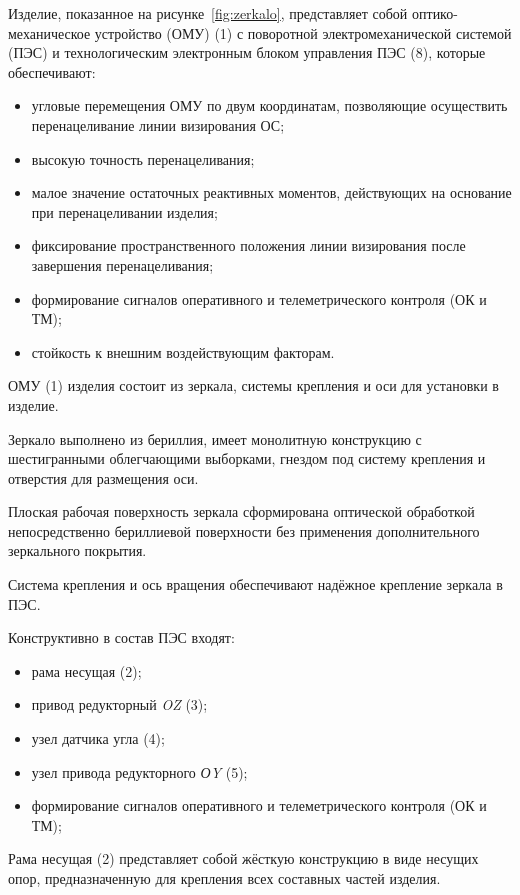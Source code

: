 Изделие, показанное на рисунке~\cref{fig:zerkalo}, представляет собой оптико-механическое устройство (ОМУ) (1) с поворотной электромеханической системой (ПЭС) и технологическим электронным блоком управления ПЭС (8), которые обеспечивают:
\begin{itemize}[beginpenalty=10000] %
	\item угловые перемещения ОМУ по двум координатам, позволяющие осуществить перенацеливание линии визирования ОС;
	\item высокую точность перенацеливания;
	\item малое значение остаточных реактивных моментов, действующих на основание при перенацеливании изделия;
	\item фиксирование пространственного положения линии визирования после завершения перенацеливания;
	\item формирование сигналов оперативного и телеметрического контроля (ОК и ТМ);
	\item стойкость к внешним воздействующим факторам.
\end{itemize}

ОМУ (1) изделия состоит из зеркала, системы крепления и оси для установки в изделие.

Зеркало выполнено из бериллия, имеет монолитную конструкцию с шестигранными облегчающими выборками, гнездом под систему крепления и отверстия для размещения оси.

Плоская рабочая поверхность зеркала сформирована оптической обработкой непосредственно бериллиевой поверхности без применения дополнительного зеркального покрытия.

Система крепления и ось вращения обеспечивают надёжное крепление зеркала в ПЭС.

Конструктивно в состав ПЭС входят:
\begin{itemize}[beginpenalty=10000] %
	\item рама несущая (2);
	\item привод редукторный \textit{OZ} (3);
	\item узел датчика угла (4);
	\item узел привода редукторного \textit{ОY} (5);
	\item формирование сигналов оперативного и телеметрического контроля (ОК и ТМ);
\end{itemize}
Рама несущая (2) представляет собой жёсткую конструкцию в виде несущих опор, предназначенную для крепления всех составных частей изделия.

